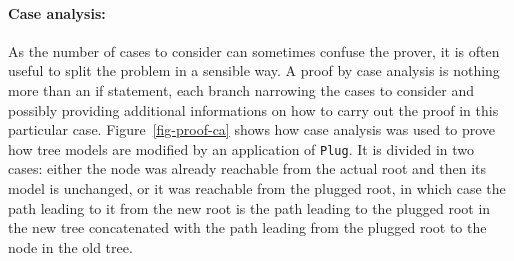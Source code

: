 \documentclass[11pt,a4paper]{article}
\begin{document}
\paragraph{Case analysis:}
As the number of cases to consider can sometimes confuse the prover, it is often useful to split the
problem in a sensible way. A proof by case analysis is nothing more than an if statement, each branch
narrowing the cases to consider and possibly providing additional informations on how to carry out
the proof in this particular case. Figure~\ref{fig-proof-ca} shows how case analysis was used to
prove how tree models are modified by an application of \texttt{Plug}. It is divided in two cases: either
the node was already reachable from the actual root and then its model is unchanged, or it was reachable
from the plugged root, in which case the path leading to it from the new root is the path leading to
the plugged root in the new tree concatenated with the path leading from the plugged root to the node
in the old tree.
\end{document}
